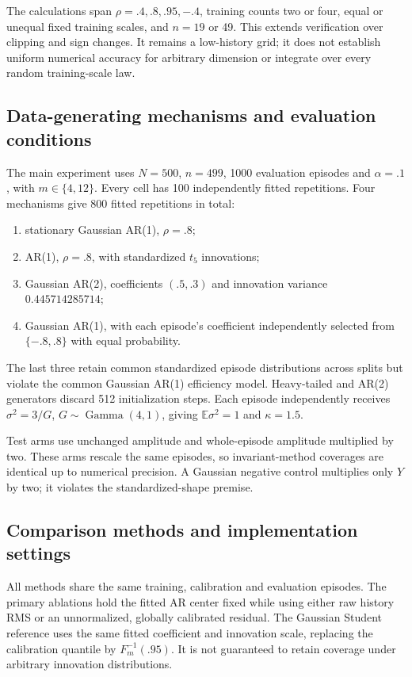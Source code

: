 \documentclass[nolineno]{ieeeaccess}
\newcommand{\E}{\mathbb{E}}
\begin{document}
The calculations span $\rho=.4,.8,.95,-.4$, training counts two or four, equal or unequal fixed training scales, and $n=19$ or 49. This extends verification over clipping and sign changes. It remains a low-history grid; it does not establish uniform numerical accuracy for arbitrary dimension or integrate over every random training-scale law.

\subsection{Data-generating mechanisms and evaluation conditions}
The main experiment uses $N=500$, $n=499$, 1000 evaluation episodes and $\alpha=.1$, with $m\in\{4,12\}$. Every cell has 100 independently fitted repetitions. Four mechanisms give 800 fitted repetitions in total:
\begin{enumerate}
\item stationary Gaussian AR(1), $\rho=.8$;
\item AR(1), $\rho=.8$, with standardized $t_5$ innovations;
\item Gaussian AR(2), coefficients $(.5,.3)$ and innovation variance $0.445714285714$;
\item Gaussian AR(1), with each episode's coefficient independently selected from $\{-.8,.8\}$ with equal probability.
\end{enumerate}
The last three retain common standardized episode distributions across splits but violate the common Gaussian AR(1) efficiency model. Heavy-tailed and AR(2) generators discard 512 initialization steps. Each episode independently receives $\sigma^2=3/G$, $G\sim\operatorname{Gamma}(4,1)$, giving $\E\sigma^2=1$ and $\kappa=1.5$.

Test arms use unchanged amplitude and whole-episode amplitude multiplied by two. These arms rescale the same episodes, so invariant-method coverages are identical up to numerical precision. A Gaussian negative control multiplies only $Y$ by two; it violates the standardized-shape premise.

\subsection{Comparison methods and implementation settings}
All methods share the same training, calibration and evaluation episodes. The primary ablations hold the fitted AR center fixed while using either raw history RMS or an unnormalized, globally calibrated residual. The Gaussian Student reference uses the same fitted coefficient and innovation scale, replacing the calibration quantile by $F_m^{-1}(.95)$. It is not guaranteed to retain coverage under arbitrary innovation distributions.
\end{document}
